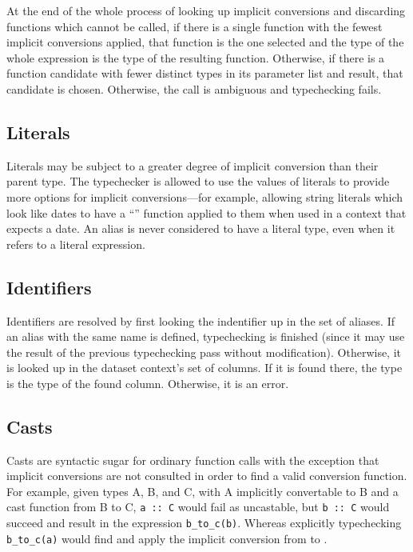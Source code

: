 \documentclass{article}
\begin{document}
At the end of the whole process of looking up implicit conversions and
discarding functions which cannot be called, if there is a single
function with the fewest implicit conversions applied, that function
is the one selected and the type of the whole expression is the type
of the resulting function.  Otherwise, if there is a function candidate
with fewer distinct types in its parameter list and result, that candidate
is chosen.  Otherwise, the call is ambiguous and typechecking fails.

\subsection{Literals}

Literals may be subject to a greater degree of implicit conversion
than their parent type.  The typechecker is allowed to use the values
of literals to provide more options for implicit conversions---for
example, allowing string literals which look like dates to have a
``'' function applied to them when used in a context
that expects a date.  An alias is never considered to have a literal
type, even when it refers to a literal expression.

\subsection{Identifiers}

Identifiers are resolved by first looking the indentifier up in the
set of aliases.  If an alias with the same name is defined,
typechecking is finished (since it may use the result of the previous
typechecking pass without modification).  Otherwise, it is looked up
in the dataset context's set of columns.  If it is found there, the
type is the type of the found column.  Otherwise, it is an error.

\subsection{Casts}

Casts are syntactic sugar for ordinary function calls with the
exception that implicit conversions are not consulted in order to find
a valid conversion function.  For example, given types A, B, and C,
with A implicitly convertable to B and a cast function 
from B to C, \lstinline|a :: C| would fail as uncastable, but
\lstinline|b :: C| would succeed and result in the expression
\lstinline|b_to_c(b)|.  Whereas explicitly typechecking
\lstinline|b_to_c(a)| would find and apply the implicit conversion
from  to .
\end{document}
